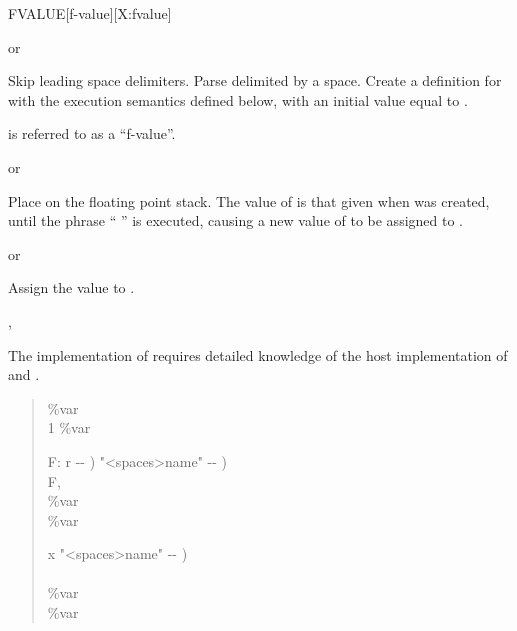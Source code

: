 \begin{worddef}{}{FVALUE}[f-value][X:fvalue]
\item {}  or

	Skip leading space delimiters.  Parse  delimited by a
	space.  Create a definition for  with the execution
	semantics defined below, with an initial value equal to .

	 is referred to as a ``f-value''.

\execute[name]
	 or 

	Place  on the floating point stack.  The value of
	 is that given when  was created, until the
	phrase ``  '' is executed, causing
	a new value of  to be assigned to .

	 or 

	Assign the value  to .

\see {}, 

	\begin{implement}
		\dffamily
		The implementation of  requires detailed
		knowledge of the host implementation of  and
		.

		\begin{quote}\ttfamily
			 \%var \\
			\word{:}  1 \%var \word{!} \word{;}

			\word{:}   F: r -{}- )  "<spaces>name" -{}- ) \\
			\tab {} F, \\
			\tab {} \%var       \\
			 \%var \word{!} \word{;}

			\word{:}   x "<spaces>name" -{}- ) \\
			\tab {} \word{,} \\
			\tab {} \%var   ~\word{!}  ~  \\
			 \%var \word{!} \word{;}
		\end{quote}
	\end{implement}


\end{worddef}
